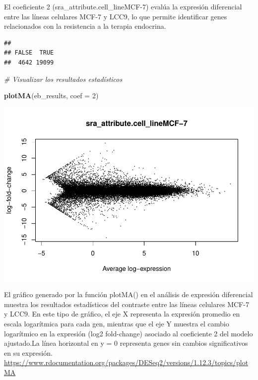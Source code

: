 \documentclass[
]{article}
\newenvironment{Shaded}{\begin{snugshade}}{\end{snugshade}}
\newcommand{\AttributeTok}[1]{\textcolor[rgb]{0.13,0.29,0.53}{#1}}
\newcommand{\CommentTok}[1]{\textcolor[rgb]{0.56,0.35,0.01}{\textit{#1}}}
\newcommand{\DecValTok}[1]{\textcolor[rgb]{0.00,0.00,0.81}{#1}}
\newcommand{\FloatTok}[1]{\textcolor[rgb]{0.00,0.00,0.81}{#1}}
\newcommand{\FunctionTok}[1]{\textcolor[rgb]{0.13,0.29,0.53}{\textbf{#1}}}
\newcommand{\NormalTok}[1]{#1}
\newcommand{\SpecialCharTok}[1]{\textcolor[rgb]{0.81,0.36,0.00}{\textbf{#1}}}
\begin{document}
El coeficiente 2 (sra\_attribute.cell\_lineMCF-7) evalúa la expresión
diferencial entre las líneas celulares MCF-7 y LCC9, lo que permite
identificar genes relacionados con la resistencia a la terapia
endocrina.

\begin{Shaded}
\end{Shaded}

\begin{verbatim}
## 
## FALSE  TRUE 
##  4642 19099
\end{verbatim}

\begin{Shaded}
\begin{Highlighting}[]
\CommentTok{\# Visualizar los resultados estadísticos}

\FunctionTok{plotMA}\NormalTok{(eb\_results, }\AttributeTok{coef =} \DecValTok{2}\NormalTok{)}
\end{Highlighting}
\end{Shaded}

\includegraphics{Proyecto_RNAseq_files/figure-latex/unnamed-chunk-14-1.pdf}

El gráfico generado por la función plotMA() en el análisis de expresión
diferencial muestra los resultados estadísticos del contraste entre las
líneas celulares MCF-7 y LCC9. En este tipo de gráfico, el eje X
representa la expresión promedio en escala logarítmica para cada gen,
mientras que el eje Y muestra el cambio logarítmico en la expresión
(log2 fold-change) asociado al coeficiente 2 del modelo ajustado.La
línea horizontal en y = 0 representa genes sin cambios significativos en
su expresión.
\url{https://www.rdocumentation.org/packages/DESeq2/versions/1.12.3/topics/plotMA}
\end{document}

